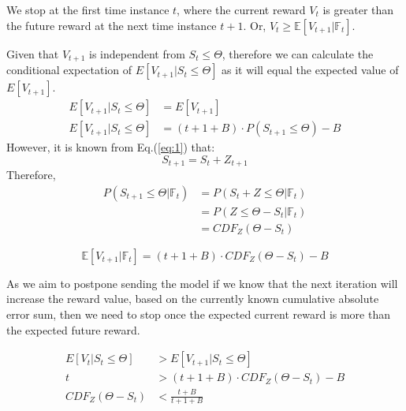 \documentclass{mpaper}
\begin{document}
We stop at the first time instance $t$, where the current reward $V_{t}$ is greater than the future reward at the next time instance $t+1$. 
Or, $V_{t} \geq \mathbb{E}[V_{t+1}|\mathbb{F}_{t}]$.


Given that $V_{t+1}$ is independent from $S_t \leq \Theta$, therefore we can calculate the conditional expectation of \newline$E[V_{t+1}|S_t\leq\Theta]$ as it will equal the expected value of $E[V_{t+1}]$.
\begin{align*}
    E[V_{t+1}|S_t\leq\Theta] &= E[V_{t+1}]\\
    E[V_{t+1}|S_t\leq\Theta] &= (t+1+B) \cdot P(S_{t+1}\leq\Theta) - B
\end{align*}
However, it is known from Eq.(\ref{eq:1}) that:
\begin{equation}
    S_{t+1} = S_t + Z_{t+1}
\end{equation}
Therefore, 
\begin{align*}
    P(S_{t+1} \leq \Theta | \mathbb{F}_t) &= P(S_t + Z \leq \Theta| \mathbb{F}_t)\\
                           &= P(Z\leq\Theta-S_t| \mathbb{F}_t)\\
                           &= CDF_{Z}(\Theta - S_t)
\end{align*}

\begin{equation}
    \mathbb{E}[V_{t+1}|\mathbb{F}_{t}] = (t+1+B) \cdot CDF_{Z}(\Theta - S_t) - B
\end{equation}

As we aim to postpone sending the model if we know that the next iteration will increase the reward value, based on the currently known cumulative absolute error sum, then we need to stop once the expected current reward is more than the expected future reward.

\begin{align*}
    E[V_{t}|S_t\leq\Theta] &> E[V_{t+1}|S_t\leq\Theta]\\
    t &> (t+1+B)\cdot CDF_{Z}(\Theta - S_t) - B\\
    CDF_{Z}(\Theta - S_t) &< \frac{t+B}{t+1+B}\\
\end{align*}
\end{document}
